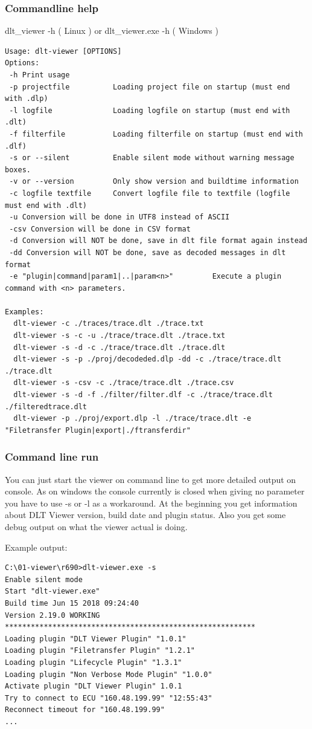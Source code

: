 \documentclass[a4paper,11pt]{article}
\begin{document}
\subsubsection{Commandline help}

dlt\_viewer -h ( Linux ) or dlt\_viewer.exe -h ( Windows )

\footnotesize\begin{verbatim}
Usage: dlt-viewer [OPTIONS]
Options:
 -h Print usage
 -p projectfile          Loading project file on startup (must end with .dlp)
 -l logfile              Loading logfile on startup (must end with .dlt)
 -f filterfile           Loading filterfile on startup (must end with .dlf)
 -s or --silent          Enable silent mode without warning message boxes.
 -v or --version         Only show version and buildtime information
 -c logfile textfile     Convert logfile file to textfile (logfile must end with .dlt)
 -u Conversion will be done in UTF8 instead of ASCII
 -csv Conversion will be done in CSV format
 -d Conversion will NOT be done, save in dlt file format again instead
 -dd Conversion will NOT be done, save as decoded messages in dlt format
 -e "plugin|command|param1|..|param<n>"         Execute a plugin command with <n> parameters.

Examples:
  dlt-viewer -c ./traces/trace.dlt ./trace.txt
  dlt-viewer -s -c -u ./trace/trace.dlt ./trace.txt
  dlt-viewer -s -d -c ./trace/trace.dlt ./trace.dlt
  dlt-viewer -s -p ./proj/decodeded.dlp -dd -c ./trace/trace.dlt ./trace.dlt
  dlt-viewer -s -csv -c ./trace/trace.dlt ./trace.csv
  dlt-viewer -s -d -f ./filter/filter.dlf -c ./trace/trace.dlt ./filteredtrace.dlt
  dlt-viewer -p ./proj/export.dlp -l ./trace/trace.dlt -e "Filetransfer Plugin|export|./ftransferdir"
\end{verbatim}
\normalsize

\subsubsection{Command line run}
You can just start the viewer on command line to get more detailed output on console.
As on windows the console currently is closed when giving no parameter you have to use -s or
-l as a workaround. At the beginning you get information about DLT Viewer version, build date and plugin status.
Also you get some debug output on what the viewer actual is doing.

Example output:

\begin{verbatim}
C:\01-viewer\r690>dlt-viewer.exe -s
Enable silent mode
Start "dlt-viewer.exe"
Build time Jun 15 2018 09:24:40
Version 2.19.0 WORKING
**********************************************************
Loading plugin "DLT Viewer Plugin" "1.0.1"
Loading plugin "Filetransfer Plugin" "1.2.1"
Loading plugin "Lifecycle Plugin" "1.3.1"
Loading plugin "Non Verbose Mode Plugin" "1.0.0"
Activate plugin "DLT Viewer Plugin" 1.0.1
Try to connect to ECU "160.48.199.99" "12:55:43"
Reconnect timeout for "160.48.199.99"
...
\end{verbatim}
\end{document}
